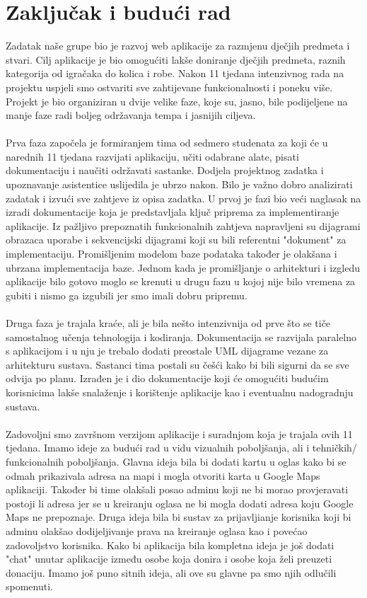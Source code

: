 \chapter{Zaključak i budući rad}
		

		Zadatak naše grupe bio je razvoj web aplikacije za razmjenu dječjih predmeta i stvari. Cilj aplikacije je bio omogućiti lakše doniranje dječjih predmeta, raznih kategorija od igračaka do kolica i robe. Nakon 11 tjedana intenzivnog rada na projektu uspjeli smo ostvariti sve zahtijevane funkcionalnosti i poneku više. Projekt je bio organiziran u dvije velike faze, koje su, jasno, bile podijeljene na manje faze radi boljeg održavanja tempa i jasnijih ciljeva. \\
  \\
Prva faza započela je formiranjem tima od sedmero studenata za koji će u narednih 11 tjedana razvijati aplikaciju, učiti odabrane alate, pisati dokumentaciju i naučiti održavati sastanke. Dodjela projektnog zadatka i upoznavanje asistentice uslijedila je ubrzo nakon. Bilo je važno dobro analizirati zadatak i izvući sve zahtjeve iz opisa zadatka. U prvoj je fazi bio veći naglasak na izradi dokumentacije koja je predstavljala ključ priprema za implementiranje aplikacije. Iz pažljivo prepoznatih funkcionalnih zahtjeva napravljeni su dijagrami obrazaca uporabe i sekvencijski dijagrami koji su bili referentni "dokument" za implementaciju. Promišljenim modelom baze podataka također je olakšana i ubrzana implementacija baze. Jednom kada je promišljanje o arhitekturi i izgledu aplikacije bilo gotovo moglo se krenuti u drugu fazu u kojoj nije bilo vremena za gubiti i nismo ga izgubili jer smo imali dobru pripremu. \\
\\
Druga faza je trajala kraće, ali je bila nešto intenzivnija od prve što se tiče samostalnog učenja tehnologija i kodiranja. Dokumentacija se razvijala paralelno s aplikacijom i u nju je trebalo dodati preostale UML dijagrame vezane za arhitekturu sustava. Sastanci tima postali su češći kako bi bili sigurni da se sve odvija po planu. Izrađen je i dio dokumentacije koji će omogućiti budućim korisnicima lakše snalaženje i korištenje aplikacije kao i eventualnu nadogradnju sustava. \\
\\
Zadovoljni smo završnom verzijom aplikacije i suradnjom koja je trajala ovih 11 tjedana. Imamo ideje za budući rad u vidu vizualnih poboljšanja, ali i tehničkih/ funkcionalnih poboljšanja. Glavna ideja bila bi dodati kartu u oglas kako bi se odmah prikazivala adresa na mapi i mogla otvoriti karta u Google Maps aplikaciji. Također bi time olakšali posao adminu koji ne bi morao provjeravati postoji li adresa jer se u kreiranju oglasa ne bi mogla dodati adresa koju Google Maps ne prepoznaje. Druga ideja bila bi sustav za prijavljianje korisnika koji bi adminu olakšao dodijeljivanje prava na kreiranje oglasa kao i povećao zadovoljstvo korisnika. Kako bi aplikacija bila kompletna ideja je još dodati "chat" unutar aplikacije između osobe koja donira i osobe koja želi preuzeti donaciju. Imamo još puno sitnih ideja, ali ove su glavne pa smo njih odlučili spomenuti.  \\
